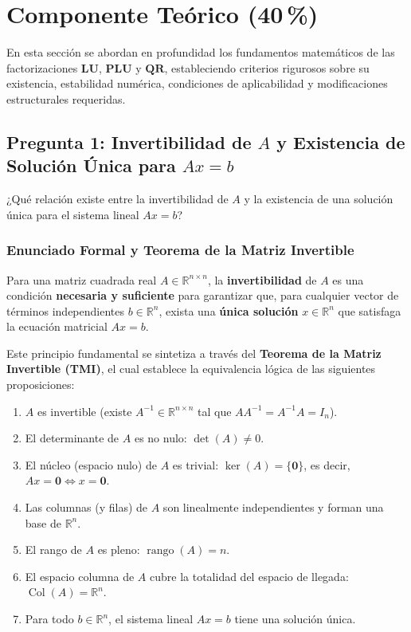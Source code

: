 \documentclass[11pt,a4paper]{article}
\theoremstyle{definition}
\theoremstyle{remark}
\begin{document}
\section{Componente Teórico (40\,\%)}

En esta sección se abordan en profundidad los fundamentos matemáticos de las factorizaciones $\mathbf{LU}$, $\mathbf{PLU}$ y $\mathbf{QR}$, estableciendo criterios rigurosos sobre su existencia, estabilidad numérica, condiciones de aplicabilidad y modificaciones estructurales requeridas.

\subsection{Pregunta 1: Invertibilidad de $A$ y Existencia de Solución Única para $Ax = b$}

\begin{solbox}[Pregunta 1]
¿Qué relación existe entre la invertibilidad de $A$ y la existencia de una solución única para el sistema lineal $Ax = b$?
\end{solbox}

\subsubsection{Enunciado Formal y Teorema de la Matriz Invertible}
Para una matriz cuadrada real $A \in \mathbb{R}^{n \times n}$, la \textbf{invertibilidad} de $A$ es una condición \textbf{necesaria y suficiente} para garantizar que, para cualquier vector de términos independientes $b \in \mathbb{R}^n$, exista una \textbf{única solución} $x \in \mathbb{R}^n$ que satisfaga la ecuación matricial $Ax = b$.

Este principio fundamental se sintetiza a través del \textbf{Teorema de la Matriz Invertible (TMI)}, el cual establece la equivalencia lógica de las siguientes proposiciones:
\begin{enumerate}[label=(\alph*), leftmargin=*]
    \item $A$ es invertible (existe $A^{-1} \in \mathbb{R}^{n \times n}$ tal que $A A^{-1} = A^{-1} A = I_n$).
    \item El determinante de $A$ es no nulo: $\det(A) \neq 0$.
    \item El núcleo (espacio nulo) de $A$ es trivial: $\ker(A) = \{\mathbf{0}\}$, es decir, $Ax = \mathbf{0} \iff x = \mathbf{0}$.
    \item Las columnas (y filas) de $A$ son linealmente independientes y forman una base de $\mathbb{R}^n$.
    \item El rango de $A$ es pleno: $\operatorname{rango}(A) = n$.
    \item El espacio columna de $A$ cubre la totalidad del espacio de llegada: $\operatorname{Col}(A) = \mathbb{R}^n$.
    \item Para todo $b \in \mathbb{R}^n$, el sistema lineal $Ax = b$ tiene una solución única.
\end{enumerate}
\end{document}
